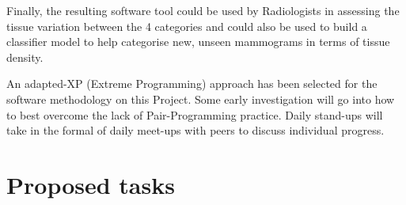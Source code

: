 \documentclass[11pt,fleqn,twoside]{article}
\begin{document}
Finally, the resulting software tool could be used by Radiologists in assessing the tissue variation between the 4 categories and could also be used to build a classifier model to help categorise new, unseen mammograms in terms of tissue density.

An adapted-XP (Extreme Programming) approach has been selected for the software methodology on this Project. Some early investigation will go into how to best overcome the lack of Pair-Programming practice. Daily stand-ups will take in the formal of daily meet-ups with peers to discuss individual progress. \par

\section{Proposed tasks}
\end{document}
